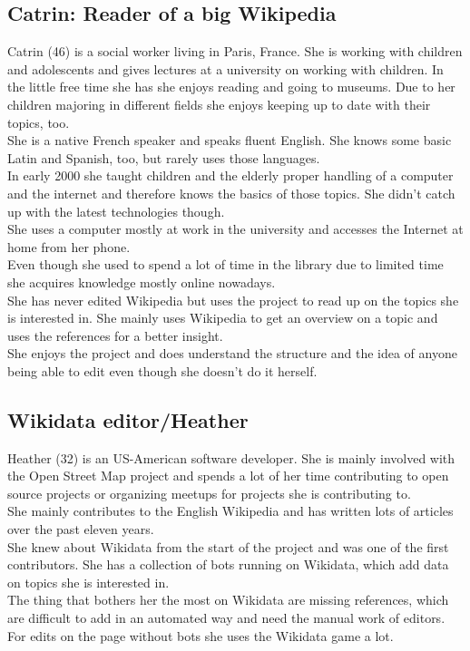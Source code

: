 \subsection{Catrin: Reader of a big Wikipedia}
Catrin (46) is a social worker living in Paris, France. She is working with children and adolescents and gives lectures at a university on working with children. In the little free time she has she enjoys reading and going to museums. Due to her children majoring in different fields she enjoys keeping up to date with their topics, too. \\
She is a native French speaker and speaks fluent English. She knows some basic Latin and Spanish, too, but rarely uses those languages. \\
In early 2000 she taught children and the elderly proper handling of a computer and the internet and therefore knows the basics of those topics. She didn't catch up with the latest technologies though. \\
She uses a computer mostly at work in the university and accesses the Internet at home from her phone. \\
Even though she used to spend a lot of time in the library due to limited time she acquires knowledge mostly online nowadays. \\
She has never edited Wikipedia but uses the project to read up on the topics she is interested in. She mainly uses Wikipedia to get an overview on a topic and uses the references for a better insight. \\
She enjoys the project and does understand the structure and the idea of anyone being able to edit even though she doesn't do it herself. \\


\subsection{Wikidata editor/Heather}
Heather (32) is an US-American software developer. She is mainly involved with the Open Street Map project and spends a lot of her time contributing to open source projects or organizing meetups for projects she is contributing to. \\
She mainly contributes to the English Wikipedia and has written lots of articles over the past eleven years. \\
She knew about Wikidata from the start of the project and was one of the first contributors. She has a collection of bots running on Wikidata, which add data on topics she is interested in. \\
The thing that bothers her the most on Wikidata are missing references, which are difficult to add in an automated way and need the manual work of editors. For edits on the page without bots she uses the Wikidata game a lot. 

